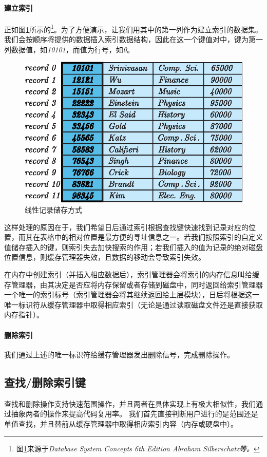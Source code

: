 \documentclass[UTF8]{ctexrep} %
\begin{document}
\paragraph{建立索引}
正如图\ref{fig:index_example}所示的\footnote{图\ref{fig:index_example}来源于\textit{Database System Concepts 6th Edition Abraham Silberschatz等。}}。为了方便演示，让我们用其中的第一列作为建立索引的数据集。我们会按顺序将提供的数据插入索引数据结构，因此在这一个键值对中，键为第一列数据值，如\textit{10101}，而值为行号，如\textit{0}。
\begin{figure}[H]
    \centering
    \includegraphics[width=0.7\linewidth]{figure/index_example.eps}
    \caption{线性记录储存方式}
    \label{fig:index_example}
\end{figure}

这样处理的原因在于，我们希望日后通过索引根据查找键快速找到记录对应的位置，而其在表格中的相对位置是最方便的寻址信息之一。若我们按照索引的自定义值储存插入的键，则索引失去加快搜索的作用；若我们插入的值为记录的绝对磁盘位置信息，则缓存管理器失效，且数据的移动会导致索引失效。
\par
在内存中创建索引（并插入相应数据后），索引管理器会将索引的内存信息叫给缓存管理器，由其决定是否应将内存保留或者存储到磁盘中，同时返回给索引管理器一个唯一的索引标号（索引管理器会将其继续返回给上层模块），日后将根据这一唯一标识符从缓存管理器中取得相应索引（无论是通过读取磁盘文件还是直接获取内存指针）。
\paragraph{删除索引}
我们通过上述的唯一标识符给缓存管理器发出删除信号，完成删除操作。

\subsection{查找/删除索引键}
查找和删除操作支持快速范围操作，并且两者在具体实现上有极大相似性，我们通过抽象两者的操作来提高代码复用率。
我们首先直接判断用户进行的是范围还是单值查找，并且替前从缓存管理器中取得相应索引内容（内存或硬盘中）。
\end{document}
